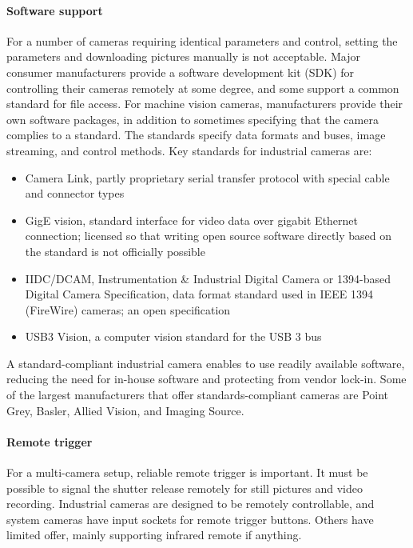 
\paragraph{Software support}
For a number of cameras requiring identical parameters and control, setting the parameters and downloading pictures manually is not acceptable.
Major consumer manufacturers provide a software development kit (SDK) for controlling their cameras remotely at some degree, and some support a common standard for file access.
For machine vision cameras, manufacturers provide their own software packages, in addition to sometimes specifying that the camera complies to a standard.
The standards specify data formats and buses, image streaming, and control methods.
Key standards for industrial cameras are: \cite{hornberg2007handbook,ni2013choosing}

\begin{itemize}
	\item Camera Link, partly proprietary serial transfer protocol with special cable and connector types %
	\item GigE vision, standard interface for video data over gigabit Ethernet connection; licensed so that writing open source software directly based on the standard is not officially possible
	\item IIDC/DCAM, Instrumentation \& Industrial Digital Camera or 1394-based Digital Camera Specification, data format standard used in IEEE 1394 (FireWire) cameras; an open specification
	\item USB3 Vision, a computer vision standard for the USB 3 bus
\end{itemize}

A standard-compliant industrial camera enables to use readily available software, reducing the need for in-house software and protecting from vendor lock-in.
Some of the largest manufacturers that offer standards-compliant cameras are Point Grey, Basler, Allied Vision, and Imaging Source.



\paragraph{Remote trigger}
For a multi-camera setup, reliable remote trigger is important.
It must be possible to signal the shutter release remotely for still pictures and video recording.
Industrial cameras are designed to be remotely controllable, and system cameras have input sockets for remote trigger buttons.
Others have limited offer, mainly supporting infrared remote if anything.

